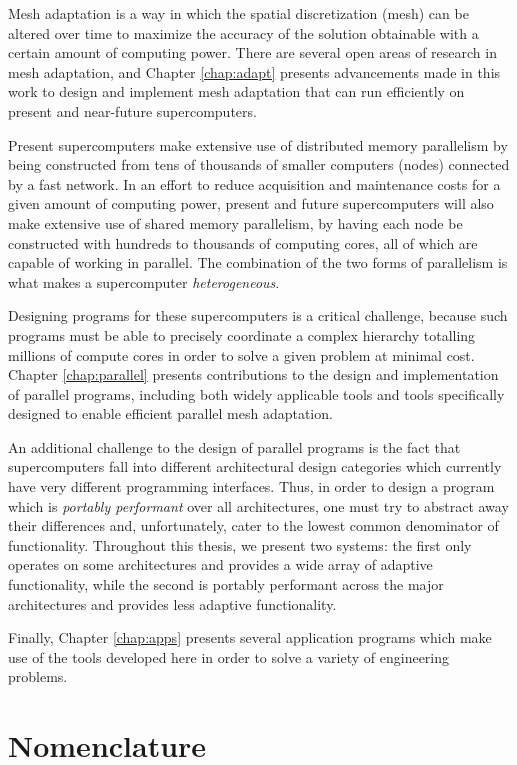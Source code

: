 Mesh adaptation is a way in which the spatial discretization
(mesh) can be altered over time to maximize the accuracy
of the solution obtainable with a certain amount
of computing power.
There are several open areas of research in mesh adaptation,
and Chapter \ref{chap:adapt} presents advancements
made in this work to design and implement
mesh adaptation that can run efficiently on present
and near-future supercomputers.

Present supercomputers make extensive use of distributed
memory parallelism by being constructed from tens of thousands of
smaller computers (nodes) connected by a fast network.
In an effort to reduce acquisition and maintenance costs
for a given amount of computing power,
present and future supercomputers will also make extensive use
of shared memory parallelism, by having each node be constructed
with hundreds to thousands of computing cores, all of which
are capable of working in parallel.
The combination of the two forms of parallelism is what
makes a supercomputer \emph{heterogeneous}.

Designing programs for these supercomputers is a critical
challenge, because such programs must be able to precisely coordinate
a complex hierarchy totalling millions of compute cores
in order to solve a given problem at minimal cost.
Chapter \ref{chap:parallel} presents contributions to
the design and implementation of parallel programs,
including both widely applicable tools and tools specifically
designed to enable efficient parallel mesh adaptation.

An additional challenge to the design of parallel programs
is the fact that supercomputers fall into different
architectural design categories which currently
have very different programming interfaces.
Thus, in order to design a program which is \emph{portably performant}
over all architectures, one must try to abstract away
their differences and, unfortunately, cater to the
lowest common denominator of functionality.
Throughout this thesis, we present two systems:
the first only operates on some architectures and provides
a wide array of adaptive functionality, while the second
is portably performant across the major architectures
and provides less adaptive functionality.

Finally, Chapter \ref{chap:apps} presents several
application programs which make use of the tools developed
here in order to solve a variety of engineering problems.

\section{Nomenclature}

